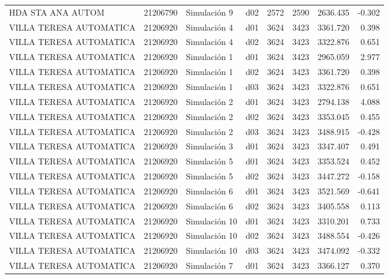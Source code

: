 \begin{landscape}
\begin{longtable}{lrlp{2cm}p{2cm}p{3cm}p{2cm}r}
       HDA STA ANA AUTOM &  21206790 &   Simulación 9 &   d02 &      2572 &     2590 &  2636.435 &    -0.302 \\
 VILLA TERESA AUTOMATICA &  21206920 &   Simulación 4 &   d01 &      3624 &     3423 &  3361.720 &     0.398 \\
 VILLA TERESA AUTOMATICA &  21206920 &   Simulación 4 &   d02 &      3624 &     3423 &  3322.876 &     0.651 \\
 VILLA TERESA AUTOMATICA &  21206920 &   Simulación 1 &   d01 &      3624 &     3423 &  2965.059 &     2.977 \\
 VILLA TERESA AUTOMATICA &  21206920 &   Simulación 1 &   d02 &      3624 &     3423 &  3361.720 &     0.398 \\
 VILLA TERESA AUTOMATICA &  21206920 &   Simulación 1 &   d03 &      3624 &     3423 &  3322.876 &     0.651 \\
 VILLA TERESA AUTOMATICA &  21206920 &   Simulación 2 &   d01 &      3624 &     3423 &  2794.138 &     4.088 \\
 VILLA TERESA AUTOMATICA &  21206920 &   Simulación 2 &   d02 &      3624 &     3423 &  3353.045 &     0.455 \\
 VILLA TERESA AUTOMATICA &  21206920 &   Simulación 2 &   d03 &      3624 &     3423 &  3488.915 &    -0.428 \\
 VILLA TERESA AUTOMATICA &  21206920 &   Simulación 3 &   d01 &      3624 &     3423 &  3347.407 &     0.491 \\
 VILLA TERESA AUTOMATICA &  21206920 &   Simulación 5 &   d01 &      3624 &     3423 &  3353.524 &     0.452 \\
 VILLA TERESA AUTOMATICA &  21206920 &   Simulación 5 &   d02 &      3624 &     3423 &  3447.272 &    -0.158 \\
 VILLA TERESA AUTOMATICA &  21206920 &   Simulación 6 &   d01 &      3624 &     3423 &  3521.569 &    -0.641 \\
 VILLA TERESA AUTOMATICA &  21206920 &   Simulación 6 &   d02 &      3624 &     3423 &  3405.558 &     0.113 \\
 VILLA TERESA AUTOMATICA &  21206920 &  Simulación 10 &   d01 &      3624 &     3423 &  3310.201 &     0.733 \\
 VILLA TERESA AUTOMATICA &  21206920 &  Simulación 10 &   d02 &      3624 &     3423 &  3488.554 &    -0.426 \\
 VILLA TERESA AUTOMATICA &  21206920 &  Simulación 10 &   d03 &      3624 &     3423 &  3474.092 &    -0.332 \\
 VILLA TERESA AUTOMATICA &  21206920 &   Simulación 7 &   d01 &      3624 &     3423 &  3366.127 &     0.370 \\

\end{longtable}
\end{landscape}
